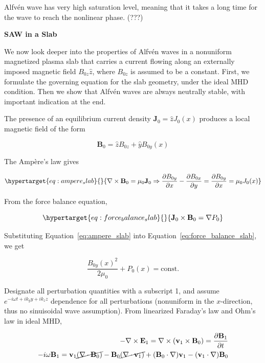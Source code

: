 \documentclass[
  notoc %
]{tufte-book}
\begin{document}
Alfvén wave has very high saturation level, meaning that it takes a long
time for the wave to reach the nonlinear phase. (???)

\textbf{SAW in a Slab}

We now look deeper into the properties of Alfvén waves in a nonuniform
magnetized plasma slab that carries a current flowing along an
externally imposed magnetic field \(B_{0z}\hat{z}\), where \(B_{0z}\) is
assumed to be a constant. First, we formulate the governing equation for
the slab geometry, under the ideal MHD condition. Then we show that
Alfvén waves are always neutrally stable, with important indication at
the end.

The presence of an equilibrium current density
\(\mathbf{J}_0 = \widehat{z}J_0(x)\) produces a local magnetic field of
the form

\[
\mathbf{B}_0 = \hat{z}B_{0z} + \hat{y}B_{0y}(x)
\]

The Ampère's law gives

\begin{equation}\protect\hypertarget{eq:ampere_slab}{}{
\nabla\times\mathbf{B}_0 = \mu_0 \mathbf{J}_0 \Rightarrow \frac{\partial B_{0y}}{\partial x}-\frac{\partial B_{0x}}{\partial y} = \frac{\partial B_{0y}}{\partial x} = \mu_0 J_0(x)
}\label{eq:ampere_slab}\end{equation}

From the force balance equation,

\begin{equation}\protect\hypertarget{eq:force_balance_slab}{}{
\mathbf{J}_0\times\mathbf{B}_0 = \nabla P_0
}\label{eq:force_balance_slab}\end{equation}

Substituting Equation~\ref{eq:ampere_slab} into
Equation~\ref{eq:force_balance_slab}, we get

\[
\frac{{B_{0y}(x)}^2}{2\mu_0} + P_0(x) = \text{const.}
\]

Designate all perturbation quantities with a subscript 1, and assume
\(e^{-i\omega t+ik_y y+ i k_z z}\) dependence for all perturbations
(nonuniform in the \(x\)-direction, thus no sinuisoidal wave
assumption). From linearized Faraday's law and Ohm's law in ideal MHD,

\[
\begin{aligned}
-\nabla\times\mathbf{E}_1 = \nabla\times(\mathbf{v}_1\times\mathbf{B}_0) = \frac{\partial\mathbf{B}_1}{\partial t} \\
-i\omega\mathbf{B}_1 = \mathbf{v}_1\cancel{(\nabla\cdot\mathbf{B}_0)}-\mathbf{B}_0\cancel{(\nabla\cdot\mathbf{v}_1)}+(\mathbf{B}_0\cdot\nabla)
\mathbf{v}_1 - (\mathbf{v}_1\cdot\nabla)\mathbf{B}_0
\end{aligned}
\]
\end{document}
